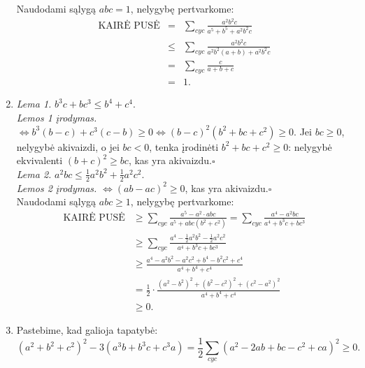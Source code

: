 \begin{enumerate}
    Naudodami sąlygą $abc=1$, nelygybę pertvarkome:
    \begin{eqnarray*} \mbox{KAIRĖ
    PUSĖ}&=&\sum_{cyc}{\frac{a^2b^2c}{a^5+b^5+a^2b^2c}}\\
    &\leq&\sum_{cyc}{\frac{a^2b^2c}{a^2b^2(a+b)+a^2b^2c}}\\
    &=&\sum_{cyc}{\frac{c}{a+b+c}}\\ &=&1. \end{eqnarray*}
\item
    \textit{Lema 1.} $b^3c+bc^3\leq b^4+c^4$.\\ \noindent\textit{Lemos 1
    įrodymas.} $\Leftrightarrow b^3(b-c)+c^3(c-b)\geq0 \Leftrightarrow
    (b-c)^2(b^2+bc+c^2)\geq0$. Jei $bc\geq0$, nelygybė akivaizdi, o jei
    $bc<0$, tenka įrodinėti $b^2+bc+c^2\geq0$: nelygybė ekvivalenti
    $(b+c)^2\geq bc$, kas yra akivaizdu.\hfill{$\square$} \\
    \textit{Lema 2.} $a^2bc\leq \frac{1}{2}a^2b^2+\frac{1}{2}a^2c^2$.\\
    \noindent\textit{Lemos 2 įrodymas.} $\Leftrightarrow (ab-ac)^2\geq0$,
    kas yra akivaizdu.\hfill{$\square$} \\ Naudodami sąlygą $abc\geq1$,
    nelygybę pertvarkome: \begin{align*} \mbox{KAIRĖ PUSĖ}&\geq
    \sum_{cyc}{\frac{a^5-a^2\cdot
    abc}{a^5+abc(b^2+c^2)}}=\sum_{cyc}{\frac{a^4-a^2bc}{a^4+b^3c+bc^3}}\\
    &\geq\sum_{cyc}{\frac{a^4-\frac{1}{2}a^2b^2-\frac{1}{2}a^2c^2}{a^4+b^3c+bc^3}}
    \tag{Lema 2}\\
    &\geq\frac{a^4-a^2b^2-a^2c^2+b^4-b^2c^2+c^4}{a^4+b^4+c^4} \tag{Lema
    1}\\
    &=\frac{1}{2}\cdot\frac{(a^2-b^2)^2+(b^2-c^2)^2+(c^2-a^2)^2}{a^4+b^4+c^4}\\
    &\geq 0.\end{align*}
\item
    Pastebime, kad galioja tapatybė: $$
    (a^2+b^2+c^2)^2-3(a^3b+b^3c+c^3a)=\frac{1}{2}\sum_{cyc}{(a^2-2ab+bc-c^2+ca)^2}\geq
    0.$$
\end{enumerate} 
